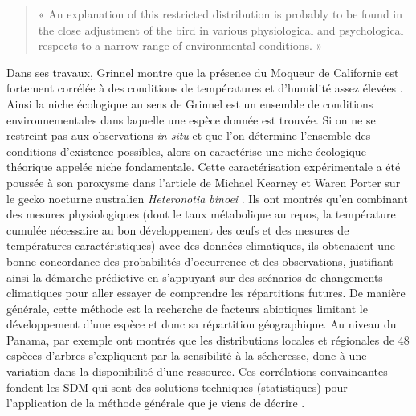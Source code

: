 \begin{quote}
« An explanation of this restricted distribution is probably to be found
in the close adjustment of the bird in various physiological and
psychological respects to a narrow range of environmental conditions. »
\end{quote}

Dans ses travaux, Grinnel montre que la présence du Moqueur de
Californie est fortement corrélée à des conditions de températures et
d'humidité assez élevées \citep{Grinnell1917a}. Ainsi la niche
écologique au sens de Grinnel est un ensemble de conditions
environnementales dans laquelle une espèce donnée est trouvée. Si on ne
se restreint pas aux observations \emph{in situ} et que l'on détermine
l'ensemble des conditions d'existence possibles, alors on caractérise
une niche écologique théorique appelée niche fondamentale. Cette
caractérisation expérimentale a été poussée à son paroxysme dans
l'article de Michael Kearney et Waren Porter sur le gecko nocturne
australien \emph{Heteronotia binoei} \citep{Kearney2004}. Ils ont
montrés qu'en combinant des mesures physiologiques (dont le taux
métabolique au repos, la température cumulée nécessaire au bon
développement des œufs et des mesures de températures caractéristiques)
avec des données climatiques, ils obtenaient une bonne concordance des
probabilités d'occurrence et des observations, justifiant ainsi la
démarche prédictive en s'appuyant sur des scénarios de changements
climatiques pour aller essayer de comprendre les répartitions futures.
De manière générale, cette méthode est la recherche de facteurs
abiotiques limitant le développement d'une espèce et donc sa répartition
géographique. Au niveau du Panama, par exemple \citet{Engelbrecht2007}
ont montrés que les distributions locales et régionales de 48 espèces
d'arbres s'expliquent par la sensibilité à la sécheresse, donc à une
variation dans la disponibilité d'une ressource. Ces corrélations
convaincantes fondent les SDM qui sont des solutions techniques
(statistiques) pour l'application de la méthode générale que je viens de
décrire \citep{Elith2006, Elith2009a}.


